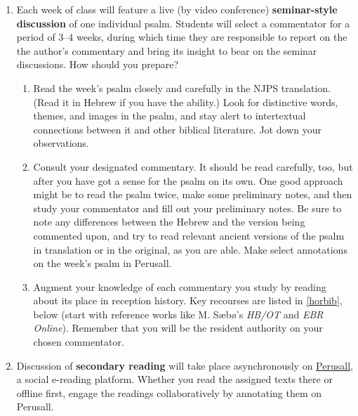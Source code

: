 \documentclass[titlepage]{article}
\begin{document}
\begin{enumerate}

	\item Each week of class will feature a live (by video conference)
	\textbf{seminar-style discussion} of one individual psalm. Students
	will select a commentator for a period of 3--4 weeks, during which
	time they are responsible to report on the the author's commentary
	and bring its insight to bear on the seminar discussions. How should
	you prepare?

	\begin{enumerate}

		\item Read the week's psalm closely and carefully in the NJPS
		translation. (Read it in Hebrew if you have the ability.) Look
		for distinctive words, themes, and images in the psalm, and stay
		alert to intertextual connections between it and other biblical
		literature. Jot down your observations.

		\item Consult your designated commentary. It should be read
		carefully, too, but after you have got a sense for the psalm on
		its own. One good approach might be to read the psalm twice,
		make some preliminary notes, and then study your commentator and
		fill out your preliminary notes. Be sure to note any differences
		between the Hebrew and the version being commented upon, and try
		to read relevant ancient versions of the psalm in translation or
		in the original, as you are able. Make select annotations on the
		week's psalm in Perusall.

		\item Augment your knowledge of each commentary you study by
		reading about its place in reception history. Key recourses are
		listed in \autoref{horbib}, below (start with reference works
		like M. Sæbø's \emph{HB/OT} and \emph{EBR Online}). Remember
		that you will be the resident authority on your chosen
		commentator.

	\end{enumerate}


	\item Discussion of \textbf{secondary reading} will take place
	asynchronously on \href{https://app.perusall.com/}{Perusall}, a
	social e-reading platform. Whether you read the assigned texts there
	or offline first, engage the readings collaboratively by annotating
	them on Perusall.

	\begin{enumerate}


\end{enumerate}
\end{enumerate}
\end{document}
